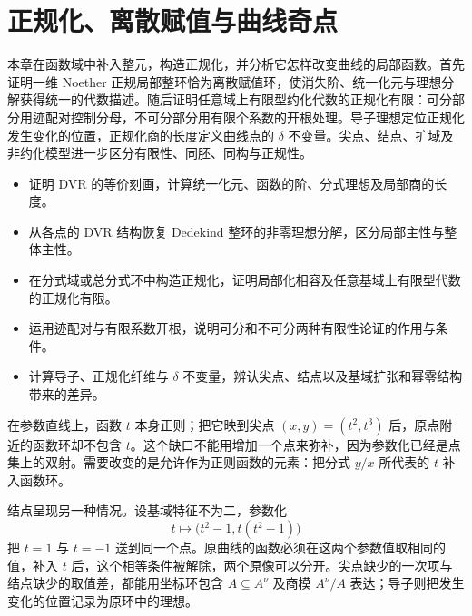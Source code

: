 
% 
% 

\chapter{正规化、离散赋值与曲线奇点}
\label{g5:ch:04}

\begin{chapterabstract}
	本章在函数域中补入整元，构造正规化，并分析它怎样改变曲线的局部函数。首先证明一维 Noether 正规局部整环恰为离散赋值环，使消失阶、统一化元与理想分解获得统一的代数描述。随后证明任意域上有限型约化代数的正规化有限：可分部分用迹配对控制分母，不可分部分用有限个系数的开根处理。导子理想定位正规化发生变化的位置，正规化商的长度定义曲线点的 \(\delta\) 不变量。尖点、结点、扩域及非约化模型进一步区分有限性、同胚、同构与正规性。
\end{chapterabstract}

\begin{learninggoals}
	\begin{itemize}
		\item 证明 DVR 的等价刻画，计算统一化元、函数的阶、分式理想及局部商的长度。
		\item 从各点的 DVR 结构恢复 Dedekind 整环的非零理想分解，区分局部主性与整体主性。
		\item 在分式域或总分式环中构造正规化，证明局部化相容及任意基域上有限型代数的正规化有限。
		\item 运用迹配对与有限系数开根，说明可分和不可分两种有限性论证的作用与条件。
		\item 计算导子、正规化纤维与 \(\delta\) 不变量，辨认尖点、结点以及基域扩张和幂零结构带来的差异。
	\end{itemize}
\end{learninggoals}

在参数直线上，函数 \(t\) 本身正则；把它映到尖点 \((x,y)=(t^2,t^3)\) 后，原点附近的函数环却不包含 \(t\)。这个缺口不能用增加一个点来弥补，因为参数化已经是点集上的双射。需要改变的是允许作为正则函数的元素：把分式 \(y/x\) 所代表的 \(t\) 补入函数环。

\ProseParagraphBreak

结点呈现另一种情况。设基域特征不为二，参数化
\[
	t\longmapsto\bigl(t^2-1,t(t^2-1)\bigr)
\]
把 \(t=1\) 与 \(t=-1\) 送到同一个点。原曲线的函数必须在这两个参数值取相同的值，补入 \(t\) 后，这个相等条件被解除，两个原像可以分开。尖点缺少的一次项与结点缺少的取值差，都能用坐标环包含 \(A\subseteq A^\nu\) 及商模 \(A^\nu/A\) 表达；导子则把发生变化的位置记录为原环中的理想。


